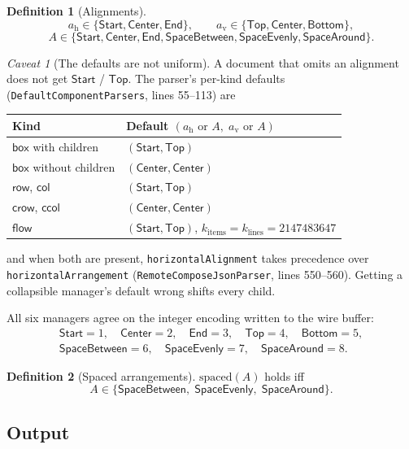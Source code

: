 \documentclass[11pt,a4paper]{article}
\newcommand{\bbox}{\mathsf{box}}
\newcommand{\rrow}{\mathsf{row}}
\newcommand{\ccol}{\mathsf{col}}
\newcommand{\crow}{\mathsf{crow}}
\newcommand{\ccolp}{\mathsf{ccol}}
\newcommand{\fflow}{\mathsf{flow}}
\newcommand{\Start}{\mathsf{Start}}
\newcommand{\Center}{\mathsf{Center}}
\newcommand{\End}{\mathsf{End}}
\newcommand{\Top}{\mathsf{Top}}
\newcommand{\Bottom}{\mathsf{Bottom}}
\newcommand{\SBetween}{\mathsf{SpaceBetween}}
\newcommand{\SEvenly}{\mathsf{SpaceEvenly}}
\newcommand{\SAround}{\mathsf{SpaceAround}}
\newcommand{\jv}[1]{\texttt{#1}}       %
\theoremstyle{definition}
\newtheorem{definition}{Definition}[section]
\theoremstyle{plain}
\theoremstyle{remark}
\newtheorem{warning}{Caveat}[section]
\begin{document}
\begin{definition}[Alignments]
\[
  a_{\mathrm{h}} \in \{\Start, \Center, \End\}, \qquad
  a_{\mathrm{v}} \in \{\Top, \Center, \Bottom\},
\]
\[
  A \in \{\Start, \Center, \End, \SBetween, \SEvenly, \SAround\}.
\]
\end{definition}

\begin{warning}[The defaults are not uniform]
\label{sec:defaults}
A document that omits an alignment does not get $\Start$ / $\Top$. The parser's
per-kind defaults (\jv{DefaultComponentParsers}, lines 55--113) are
\begin{center}
\small
\begin{tabular}{@{}ll@{}}
\toprule
\textbf{Kind} & \textbf{Default $(a_{\mathrm{h}}\text{ or }A,\; a_{\mathrm{v}}\text{ or }A)$} \\
\midrule
$\bbox$ with children & $(\Start, \Top)$ \\
$\bbox$ without children & $(\Center, \Center)$ \\
$\rrow$, $\ccol$ & $(\Start, \Top)$ \\
$\crow$, $\ccolp$ & $(\Center, \Center)$ \\
$\fflow$ & $(\Start, \Top)$, $k_{\mathrm{items}} = k_{\mathrm{lines}} = 2147483647$ \\
\bottomrule
\end{tabular}
\end{center}
and when both are present, \jv{horizontalAlignment} takes precedence over
\jv{horizontalArrangement} (\jv{RemoteComposeJsonParser}, lines 550--560).
Getting a collapsible manager's default wrong shifts every child.
\end{warning}

All six managers agree on the integer encoding written to the wire buffer:
\[
  \begin{gathered}
    \Start = 1,\quad \Center = 2,\quad \End = 3,\quad \Top = 4,\quad \Bottom = 5, \\
    \SBetween = 6,\quad \SEvenly = 7,\quad \SAround = 8 .
  \end{gathered}
\]

\begin{definition}[Spaced arrangements]
$\mathrm{spaced}(A)$ holds iff
\[
  A \in \{\SBetween,\; \SEvenly,\; \SAround\}.
\]
\end{definition}

\subsection{Output}
\end{document}
